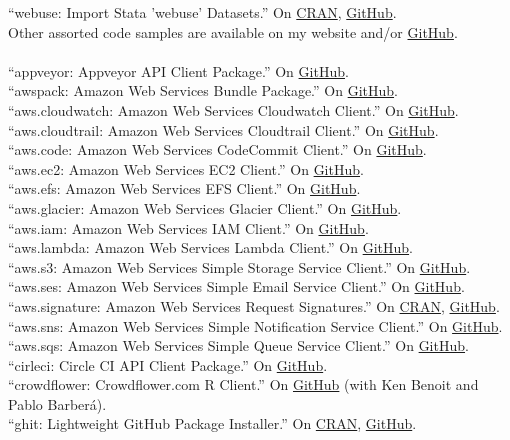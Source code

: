 \documentclass[12pt]{article}
\newcommand{\topic}[1]{\pagebreak[3]\indent {\color{lg}{\footnotesize #1 }}\\}
\newcommand{\entry}[1]{\indent {\color{lg}\guillemotright}\hspace{2pt}#1\vspace{.25em}\\}
\begin{document}
	\entry{``webuse: Import Stata 'webuse' Datasets.'' On \href{https://cran.r-project.org/package=webuse}{CRAN}, \href{https://github.com/leeper/webuse}{GitHub}.}
	\entry{Other assorted code samples are available on my website and/or \href{http://github.com/leeper}{GitHub}.}
\topic{R packages contributed to the cloudyr project}
	\entry{``appveyor: Appveyor API Client Package.'' On \href{https://github.com/cloudyr/appveyor}{GitHub}.}
	\entry{``awspack: Amazon Web Services Bundle Package.'' On \href{https://github.com/cloudyr/awspack}{GitHub}.}
	\entry{``aws.cloudwatch: Amazon Web Services Cloudwatch Client.'' On \href{https://github.com/cloudyr/aws.cloudwatch}{GitHub}.}
	\entry{``aws.cloudtrail: Amazon Web Services Cloudtrail Client.'' On \href{https://github.com/cloudyr/aws.cloudtrail}{GitHub}.}
	\entry{``aws.code: Amazon Web Services CodeCommit Client.'' On \href{https://github.com/cloudyr/aws.code}{GitHub}.}
	\entry{``aws.ec2: Amazon Web Services EC2 Client.'' On \href{https://github.com/cloudyr/aws.ec2}{GitHub}.}
	\entry{``aws.efs: Amazon Web Services EFS Client.'' On \href{https://github.com/cloudyr/aws.efs}{GitHub}.}
	\entry{``aws.glacier: Amazon Web Services Glacier Client.'' On \href{https://github.com/cloudyr/aws.glacier}{GitHub}.}
	\entry{``aws.iam: Amazon Web Services IAM Client.'' On \href{https://github.com/cloudyr/aws.iam}{GitHub}.}
	\entry{``aws.lambda: Amazon Web Services Lambda Client.'' On \href{https://github.com/cloudyr/aws.lambda}{GitHub}.}
	\entry{``aws.s3: Amazon Web Services Simple Storage Service Client.'' On \href{https://github.com/cloudyr/aws.s3}{GitHub}.}
	\entry{``aws.ses: Amazon Web Services Simple Email Service Client.'' On \href{https://github.com/cloudyr/aws.ses}{GitHub}.}
	\entry{``aws.signature: Amazon Web Services Request Signatures.'' On \href{https://cran.r-project.org/package=aws.signature}{CRAN}, \href{https://github.com/cloudyr/aws.signature}{GitHub}.}
	\entry{``aws.sns: Amazon Web Services Simple Notification Service Client.'' On \href{https://github.com/cloudyr/aws.sns}{GitHub}.}
	\entry{``aws.sqs: Amazon Web Services Simple Queue Service Client.'' On \href{https://github.com/cloudyr/aws.sqs}{GitHub}.}
	\entry{``cirleci: Circle CI API Client Package.'' On \href{https://github.com/cloudyr/circleci}{GitHub}.}
	\entry{``crowdflower: Crowdflower.com R Client.'' On \href{https://github.com/cloudyr/crowdflower}{GitHub} (with Ken Benoit and Pablo Barber\'{a}).}
	\entry{``ghit: Lightweight GitHub Package Installer.'' On \href{https://cran.r-project.org/package=ghit}{CRAN}, \href{https://github.com/cloudyr/ghit}{GitHub}.}
\end{document}
